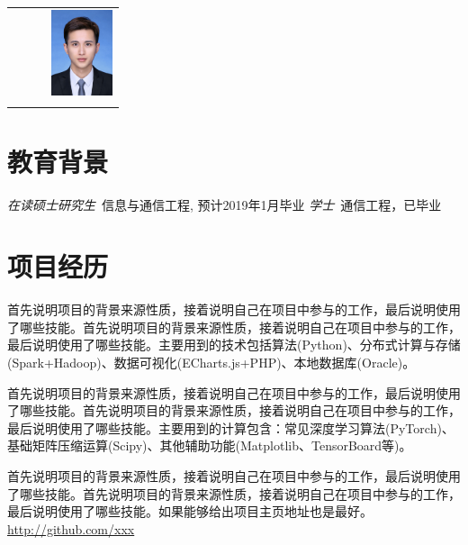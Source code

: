 \documentclass{resume}
\begin{document}
\Large{
  \begin{tabu} to \textwidth { X[1.5,c] X[1.8,c] X[2,c] X[0.8,c]}
     &
    \\
     \\
     &  &  & \\
  \end{tabu}
}

\section{教育背景}
\normalsize{\textit{在读硕士研究生}\ 信息与通信工程, 预计2019年1月毕业}
\normalsize{\textit{学士}\ 通信工程，已毕业}

\section{项目经历}
\normalsize{首先说明项目的背景来源性质，接着说明自己在项目中参与的工作，最后说明使用了哪些技能。首先说明项目的背景来源性质，接着说明自己在项目中参与的工作，最后说明使用了哪些技能。主要用到的技术包括算法(Python)、分布式计算与存储(Spark+Hadoop)、数据可视化(ECharts.js+PHP)、本地数据库(Oracle)。}


\normalsize{首先说明项目的背景来源性质，接着说明自己在项目中参与的工作，最后说明使用了哪些技能。首先说明项目的背景来源性质，接着说明自己在项目中参与的工作，最后说明使用了哪些技能。主要用到的计算包含：常见深度学习算法(PyTorch)、基础矩阵压缩运算(Scipy)、其他辅助功能(Matplotlib、TensorBoard等)。}


\normalsize{首先说明项目的背景来源性质，接着说明自己在项目中参与的工作，最后说明使用了哪些技能。首先说明项目的背景来源性质，接着说明自己在项目中参与的工作，最后说明使用了哪些技能。如果能够给出项目主页地址也是最好。\href{项目主页：http://github.com/xxx}{http://github.com/xxx}}
\end{document}
